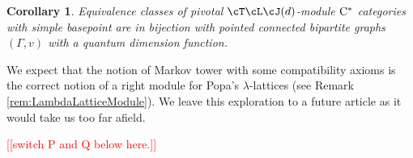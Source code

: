 \documentclass[11pt]{article}
\theoremstyle{plain}
\newtheorem{coralpha}[thmalpha]{Corollary}
\theoremstyle{definition}
\DeclareMathOperator{\tr}{tr}
\newcommand{\Cstar}{\rm{C^*}}
\newcommand{\nn}[1]{\textcolor{red}{[[#1]]}}
\begin{document}
\begin{coralpha}
\label{cor:TLJPivotalModuleClassification}
Equivalence classes of pivotal $\cT\cL\cJ(d)$-module $\Cstar$ categories with simple basepoint
are in bijection with 
pointed connected bipartite graphs $(\Gamma, v)$ with a quantum dimension function.
\end{coralpha}

We expect that the notion of Markov tower with some compatibility axioms is the correct notion of a right module for Popa's $\lambda$-lattices (see Remark \ref{rem:LambdaLatticeModule}).
We leave this exploration to a future article as it would take us too far afield.



\nn{switch P and Q below here.}
\end{document}
